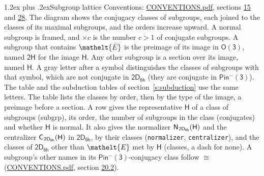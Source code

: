 \documentclass[10pt,a4paper]{article}
\makeatletter
\renewcommand\section{\@startsection{section}{1}{\z@}{-3ex plus -1ex minus -.2ex}%
  {1.2ex plus .2ex}{\normalfont\large\sffamily\bfseries\color{parttitle}}}
\numberwithin{equation}{section}
\newcommand{\eltfont}[1]{{\let\sigma\eltsigma\mathelt{#1}}}
\newcommand{\grp}[1]{\mathsf{#1}}
\newcommand{\cls}[1]{\eltfont{#1}}
\newcommand{\elt}[1]{\eltfont{#1}}
\newcommand{\samecls}{\cong}
\newcommand{\barred}[1]{\bar{#1}}
\newcommand{\hairsp}{\mkern1mu}
\makeatother
\begin{document}
\section{Subgroup lattice}\label{s:subgroups}
Conventions: \href{../../CONVENTIONS.pdf}{CONVENTIONS.pdf}, sections \href{../../../rotation/CONVENTIONS.pdf\#conv.15}{15} and \href{../../CONVENTIONS.pdf\#conv.28}{28}.
The diagram shows the conjugacy classes of subgroups, each joined to the classes of its maximal subgroups, and the orders increase upward. A normal subgroup is framed, and ${\times}c$ is the number $c > 1$ of conjugate subgroups. \label{n:group.H}A subgroup that contains $\elt{\barred{E}}$ is the preimage of its image in $\grp{O(3)}$, named $\grp{2H}$ for the image $\grp{H}$. Any other subgroup is a section over its image, named $\grp{H}$. A gray letter after a symbol distinguishes the classes of subgroups with that symbol, which are not conjugate in $\grp{2D_{6h}}$ (they are conjugate in \href{Pinminus3.pdf}{$\grp{Pin^{-}(3)}$}). The table and the subduction tables of section~\ref{s:subduction} use the same letters. The table lists the classes by order, then by the type of the image, a preimage before a section. \label{n:head.subgroup}\label{n:head.order}\label{n:head.conjugates}\label{n:head.normal}A row gives the representative $\grp{H}$ of a class of subgroups (subgrp), its order, the number of subgroups in the class (conjugates) and whether $\grp{H}$ is normal. \label{n:group.normalizer}\label{n:group.centralizer}\label{n:head.classes}It also gives the normalizer $\grp{N}_{\hairsp \grp{2D_{6h}}}(\grp{H})$ and the centralizer $\grp{C}_{\hairsp \grp{2D_{6h}}}(\grp{H})$ in $\grp{2D_{6h}}$, by their classes (\texttt{normalizer}, \texttt{centralizer}), and the classes of $\grp{2D_{6h}}$ other than $\cls{E}$ met by $\grp{H}$ (classes, a dash for none). A subgroup's other names in its \href{Pinminus3.pdf}{$\grp{Pin^{-}(3)}$}-conjugacy class follow $\samecls$ (\href{../../CONVENTIONS.pdf}{CONVENTIONS.pdf}, section \href{../../CONVENTIONS.pdf\#conv.20.2}{20.2}).
\end{document}
